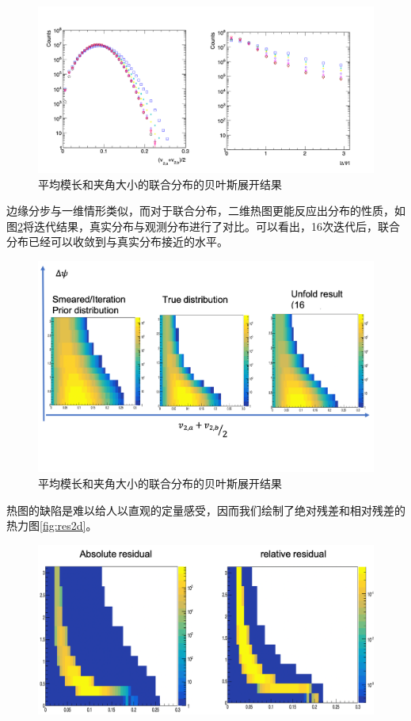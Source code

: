\documentclass[aps,pre,12pt,preprint,onecolumn,showpacs,showkeys]{revtex4-1}
\begin{document}
\begin{enumerate}
\begin{figure}[htbp]
    \centering
    \includegraphics[width=140mm]{2d_vp_the.png}
    \caption{平均模长和夹角大小的联合分布的贝叶斯展开结果\label{fig:bu2d}}%
    \end{figure}
    边缘分步与一维情形类似，而对于联合分布，二维热图更能反应出分布的性质，如图\ref{fig:bu2dc}将迭代结果，真实分布与观测分布进行了对比。可以看出，16次迭代后，联合分布已经可以收敛到与真实分布接近的水平。\par
    \begin{figure}[htbp]
        \centering
        \includegraphics[width=140mm]{2d_vp_the_compare.png}
        \caption{平均模长和夹角大小的联合分布的贝叶斯展开结果\label{fig:bu2dc}}%
        \end{figure}
    热图的缺陷是难以给人以直观的定量感受，因而我们绘制了绝对残差和相对残差的热力图\ref{fig:res2d}。\par
    \begin{figure}[htbp]
        \centering
        \includegraphics[width=140mm]{res.png}

\end{figure}
\end{enumerate}
\end{document}
